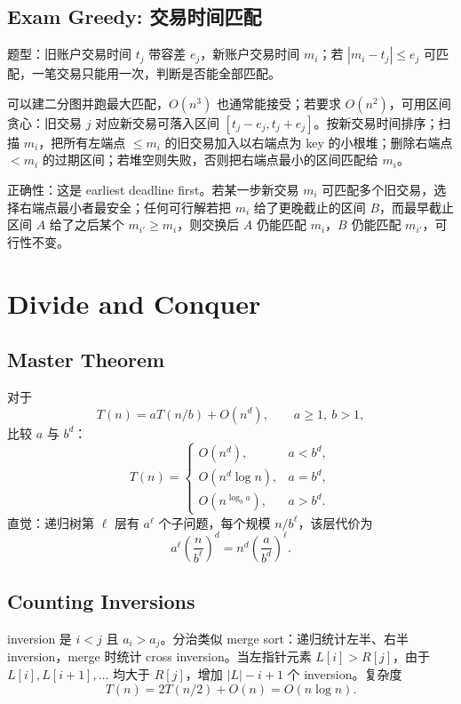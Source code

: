 \documentclass[UTF8,a4paper,11pt]{ctexart}
\begin{document}
\subsection{Exam Greedy: 交易时间匹配}

题型：旧账户交易时间 $t_j$ 带容差 $e_j$，新账户交易时间 $m_i$；若 $|m_i-t_j|\le e_j$ 可匹配，一笔交易只能用一次，判断是否能全部匹配。

可以建二分图并跑最大匹配，$O(n^3)$ 也通常能接受；若要求 $O(n^2)$，可用区间贪心：旧交易 $j$ 对应新交易可落入区间 $[t_j-e_j,t_j+e_j]$。按新交易时间排序；扫描 $m_i$，把所有左端点 $\le m_i$ 的旧交易加入以右端点为 key 的小根堆；删除右端点 $<m_i$ 的过期区间；若堆空则失败，否则把右端点最小的区间匹配给 $m_i$。

正确性：这是 earliest deadline first。若某一步新交易 $m_i$ 可匹配多个旧交易，选择右端点最小者最安全；任何可行解若把 $m_i$ 给了更晚截止的区间 $B$，而最早截止区间 $A$ 给了之后某个 $m_{i'}\ge m_i$，则交换后 $A$ 仍能匹配 $m_i$，$B$ 仍能匹配 $m_{i'}$，可行性不变。

\section{Divide and Conquer}

\subsection{Master Theorem}

对于
\[
T(n)=aT(n/b)+O(n^d),\qquad a\ge 1,\ b>1,
\]
比较 $a$ 与 $b^d$：
\[
T(n)=
\begin{cases}
O(n^d), & a<b^d,\\
O(n^d\log n), & a=b^d,\\
O(n^{\log_b a}), & a>b^d.
\end{cases}
\]
直觉：递归树第 $\ell$ 层有 $a^\ell$ 个子问题，每个规模 $n/b^\ell$，该层代价为
\[
a^\ell\left(\frac{n}{b^\ell}\right)^d=n^d\left(\frac{a}{b^d}\right)^\ell.
\]

\subsection{Counting Inversions}

inversion 是 $i<j$ 且 $a_i>a_j$。分治类似 merge sort：递归统计左半、右半 inversion，merge 时统计 cross inversion。当左指针元素 $L[i]>R[j]$，由于 $L[i],L[i+1],\ldots$ 均大于 $R[j]$，增加 $|L|-i+1$ 个 inversion。复杂度
\[
T(n)=2T(n/2)+O(n)=O(n\log n).
\]
\end{document}
